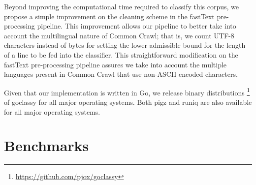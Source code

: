Beyond improving the computational time required to classify this corpus, we propose a simple improvement on the cleaning scheme in the fastText pre-processing pipeline. This improvement allows our pipeline to better take into account the multilingual nature of Common Crawl; that is, we count UTF-8 characters instead of bytes for setting the lower admissible bound for the length of a line to be fed into the classifier. This straightforward modification on the fastText pre-processing pipeline assures we take into account the multiple languages present in Common Crawl that use non-ASCII encoded characters.

Given that our implementation is written in Go, we release binary distributions \footnote{\url{https://github.com/pjox/goclassy}} of goclassy for all major operating systems. Both pigz and runiq are also available for all major operating systems.

\section{Benchmarks}

